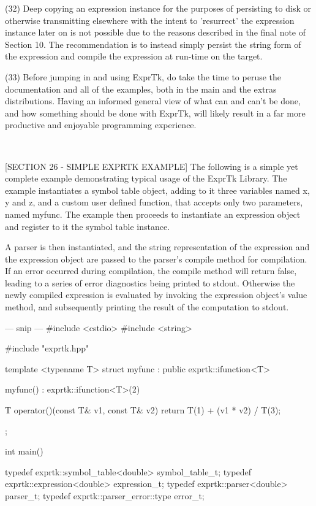 {(32) Deep  copying  an  expression  instance  for  the  purposes  of
persisting to disk or otherwise transmitting elsewhere with the
intent to 'resurrect' the  expression instance later on  is not
possible due  to the  reasons described  in the  final note  of
Section 10. The recommendation is to instead simply persist the
string form  of the  expression and  compile the  expression at
run-time on the target.

(33) Before jumping in and using ExprTk, do take the time to  peruse
the documentation and all of the examples, both in the main and
the extras  distributions. Having  an informed  general view of
what can and  can't be done,  and how something  should be done
with ExprTk, will  likely result in  a far more  productive and
enjoyable programming experience.

~~~~~~~~~~~~~~~~~~~~~~~~~~~~~~~~~~~~~~~~~~~~~~~~~~~~~~~~~~

[SECTION 26 - SIMPLE EXPRTK EXAMPLE]
The following is a  simple yet complete example  demonstrating typical
usage of the ExprTk Library.  The example instantiates a symbol  table
object, adding to it  three variables named x,  y and z, and  a custom
user defined function, that accepts only two parameters, named myfunc.
The  example then  proceeds to  instantiate an  expression object  and
register to it the symbol table instance.

A parser is  then instantiated, and  the string representation  of the
expression  and  the  expression object  are  passed  to the  parser's
compile  method   for  compilation.   If  an   error  occurred  during
compilation, the compile method will return false, leading to a series
of  error diagnostics  being printed  to stdout.  Otherwise the  newly
compiled expression is evaluated  by invoking  the expression object's
value method, and subsequently printing the result  of the computation
to stdout.


--- snip ---
\#include <cstdio>
\#include <string>

\#include "exprtk.hpp"

template <typename T>
struct myfunc : public exprtk::ifunction<T>
{
	myfunc() : exprtk::ifunction<T>(2) {}
	
	T operator()(const T\& v1, const T\& v2)
	{
		return T(1) + (v1 * v2) / T(3);
	}
};

int main()
{
	typedef exprtk::symbol\_table<double> symbol\_table\_t;
	typedef exprtk::expression<double>     expression\_t;
	typedef exprtk::parser<double>             parser\_t;
	typedef exprtk::parser\_error::type          error\_t;
	
}}
